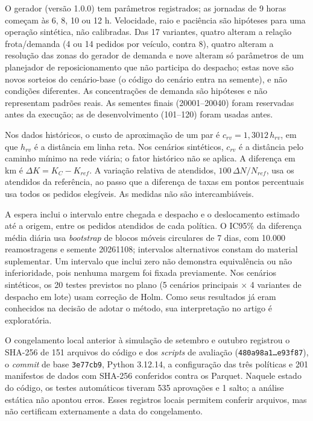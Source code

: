 
O gerador (versão 1.0.0) tem parâmetros registrados; as jornadas de 9 horas começam às 6, 8, 10 ou 12 h. Velocidade, raio e paciência são hipóteses para uma operação sintética, não calibradas. Das 17 variantes, quatro alteram a relação frota/demanda (4 ou 14 pedidos por veículo, contra 8), quatro alteram a resolução das zonas do gerador de demanda e nove alteram só parâmetros de um planejador de reposicionamento que não participa do despacho; estas nove são novos sorteios do cenário-base (o código do cenário entra na semente), e não condições diferentes. As concentrações de demanda são hipóteses e não representam padrões reais. As sementes finais (20001--20040) foram reservadas antes da execução; as de desenvolvimento (101--120) foram usadas antes.


Nos dados históricos, o custo de aproximação de um par é $c_{rv}=1{,}3012\,h_{rv}$, em que $h_{rv}$ é a distância em linha reta. Nos cenários sintéticos, $c_{rv}$ é a distância pelo caminho mínimo na rede viária; o fator histórico não se aplica. A diferença em km é $\Delta K=K_C-K_{ref}$. A variação relativa de atendidos, $100\,\Delta N/N_{ref}$, usa os atendidos da referência, ao passo que a diferença de taxas em pontos percentuais usa todos os pedidos elegíveis. As medidas não são intercambiáveis.

A espera inclui o intervalo entre chegada e despacho e o deslocamento estimado até a origem, entre os pedidos atendidos de cada política. O IC95\% da diferença média diária usa \textit{bootstrap} de blocos móveis circulares de 7 dias, com 10.000 reamostragens e semente 20261108; intervalos alternativos constam do material suplementar. Um intervalo que inclui zero não demonstra equivalência ou não inferioridade, pois nenhuma margem foi fixada previamente. Nos cenários sintéticos, os 20 testes previstos no plano (5 cenários principais $\times$ 4 variantes de despacho em lote) usam correção de Holm. Como seus resultados já eram conhecidos na decisão de adotar o método, sua interpretação no artigo é exploratória.



O congelamento local anterior à simulação de setembro e outubro registrou o SHA-256 de 151 arquivos do código e dos \textit{scripts} de avaliação (\texttt{480a98a1\ldots e93f87}), o \textit{commit} de base \texttt{3e77cb9}, Python 3.12.14, a configuração das três políticas e 201 manifestos de dados com SHA-256 conferidos contra os Parquet. Naquele estado do código, os testes automáticos tiveram 535 aprovações e 1 salto; a análise estática não apontou erros. Esses registros locais permitem conferir arquivos, mas não certificam externamente a data do congelamento.

